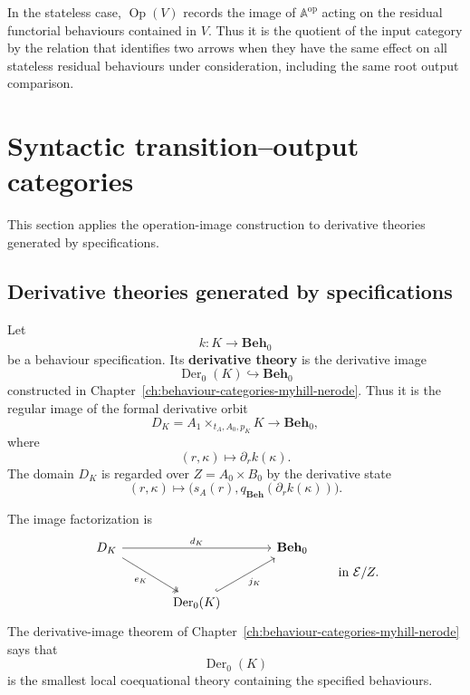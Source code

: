 In the stateless case, \(\operatorname{Op}(V)\) records the image of
\(\mathbb A^{\mathrm{op}}\) acting on the residual functorial behaviours
contained in \(V\). Thus it is the quotient of the input category by the
relation that identifies two arrows when they have the same effect on all
stateless residual behaviours under consideration, including the same root
output comparison.

\section{Syntactic transition--output categories}
\label{sec:syntactic-transition-output-categories}

This section applies the operation-image construction to derivative theories
generated by specifications.

\subsection{Derivative theories generated by specifications}
\label{subsec:derivative-theories-specifications}

\begin{definition}
\label{def:derivative-theory-generated-by-specification}
    Let
    \[
        k:K\to\mathbf{Beh}_0
    \]
    be a behaviour specification. Its \textbf{derivative theory} is the
    derivative image
    \[
        \operatorname{Der}_0(K)\hookrightarrow\mathbf{Beh}_0
    \]
    constructed in Chapter~\ref{ch:behaviour-categories-myhill-nerode}. Thus it
    is the regular image of the formal derivative orbit
    \[
        D_K
        =
        A_1\times_{t_A,A_0,p_K}K
        \to
        \mathbf{Beh}_0,
    \]
    where
    \[
        (r,\kappa)\longmapsto \partial_r k(\kappa).
    \]
    The domain \(D_K\) is regarded over \(Z=A_0\times B_0\) by the derivative
    state
    \[
        (r,\kappa)\longmapsto
        \bigl(s_A(r),q_{\mathbf{Beh}}(\partial_r k(\kappa))\bigr).
    \]
\end{definition}

The image factorization is
\[
\begin{tikzcd}[column sep=large, row sep=large]
    D_K
        \arrow[rr, "d_K"]
        \arrow[dr, two heads, "e_K"']
    &&
    \mathbf{Beh}_0
    \\
    &
    \operatorname{Der}_0(K)
        \arrow[ur, hook, "j_K"']
    &
\end{tikzcd}
\qquad
\text{in }\mathcal E/Z.
\]
The derivative-image theorem of
Chapter~\ref{ch:behaviour-categories-myhill-nerode} says that
\[
    \operatorname{Der}_0(K)
\]
is the smallest local coequational theory containing the specified behaviours.

